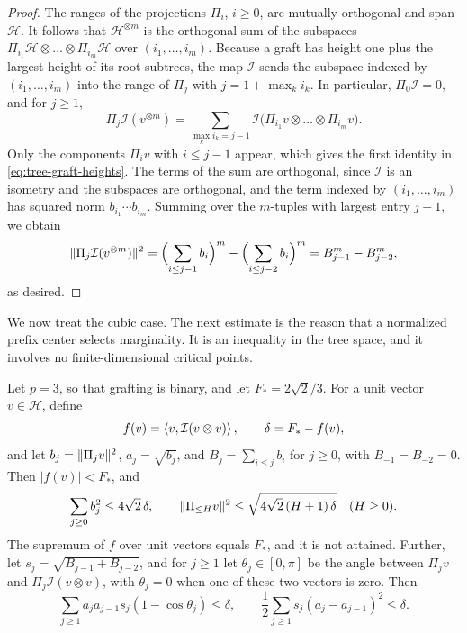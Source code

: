\begin{proof}
The ranges of the projections $\Pi_i$, $i\ge0$, are mutually orthogonal and span $\mathcal H$. It follows that $\mathcal H^{\otimes m}$ is the orthogonal sum of the subspaces $\Pi_{i_1}\mathcal H\otimes\dots\otimes\Pi_{i_m}\mathcal H$ over $(i_1,\dots,i_m)$. Because a graft has height one plus the largest height of its root subtrees, the map $\mathcal I$ sends the subspace indexed by $(i_1,\dots,i_m)$ into the range of $\Pi_j$ with $j=1+\max_ki_k$. In particular, $\Pi_0\mathcal I=0$, and for $j\ge1$,
\[
 \Pi_j\mathcal I(v^{\otimes m})=\sum_{\max_ki_k=j-1}\mathcal I\bigl(\Pi_{i_1}v\otimes\dots\otimes\Pi_{i_m}v\bigr).
\]
Only the components $\Pi_iv$ with $i\le j-1$ appear, which gives the first identity in \eqref{eq:tree-graft-heights}. The terms of the sum are orthogonal, since $\mathcal I$ is an isometry and the subspaces are orthogonal, and the term indexed by $(i_1,\dots,i_m)$ has squared norm $b_{i_1}\cdots b_{i_m}$. Summing over the $m$-tuples with largest entry $j-1$, we obtain
\[
 \lVert\Pi_j\mathcal I(v^{\otimes m})\rVert^2=\Bigl(\sum_{i\le j-1}b_i\Bigr)^m-\Bigl(\sum_{i\le j-2}b_i\Bigr)^m=B_{j-1}^m-B_{j-2}^m,
\]
as desired.
\end{proof}

We now treat the cubic case. The next estimate is the reason that a normalized prefix center selects marginality. It is an inequality in the tree space, and it involves no finite-dimensional critical points.

\begin{theorem}
\label{thm:geometry-tree-ceiling}
Let $p=3$, so that grafting is binary, and let $F_*=2\sqrt2/3$. For a unit vector $v\in\mathcal H$, define
\[
 f(v)=\left\langle v,\mathcal I(v\otimes v)\right\rangle,\qquad \delta=F_*-f(v),
\]
and let $b_j=\lVert\Pi_jv\rVert^2$, $a_j=\sqrt{b_j}$, and $B_j=\sum_{i\le j}b_i$ for $j\ge0$, with $B_{-1}=B_{-2}=0$. Then $|f(v)|<F_*$, and
\begin{equation}
 \sum_{j\ge0}b_j^2\le4\sqrt2\,\delta,
 \qquad
 \lVert\Pi_{\le H}v\rVert^2\le\sqrt{4\sqrt2\,(H+1)\,\delta}\quad(H\ge0).
 \label{eq:geometry-height-defect}
\end{equation}
The supremum of $f$ over unit vectors equals $F_*$, and it is not attained. Further, let $s_j=\sqrt{B_{j-1}+B_{j-2}}$, and for $j\ge1$ let $\theta_j\in[0,\pi]$ be the angle between $\Pi_jv$ and $\Pi_j\mathcal I(v\otimes v)$, with $\theta_j=0$ when one of these two vectors is zero. Then
\begin{equation}
 \sum_{j\ge1}a_ja_{j-1}s_j(1-\cos\theta_j)\le\delta,
 \qquad
 \frac12\sum_{j\ge1}s_j(a_j-a_{j-1})^2\le\delta.
 \label{eq:geometry-angular-young-defects}
\end{equation}
\end{theorem}

